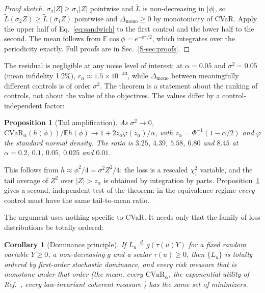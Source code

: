 \documentclass[aps,pra,twocolumn,superscriptaddress,reprint,nofootinbib,floatfix]{revtex4-2}
\newtheorem{proposition}{Proposition}
\newtheorem{corollary}{Corollary}
\theoremstyle{definition}
\newcommand{\cvar}{\mathrm{CVaR}}
\newcommand{\E}{\mathbb{E}}
\newcommand{\Lt}{\widetilde L}
\newcommand{\sref}[1]{Sec.~\ref{S-#1}}
\begin{document}
\begin{proof}[Proof sketch]
$\sigma_2|Z|\ge\sigma_1|Z|$ pointwise and $\Lt$ is non-decreasing in
$|\phi|$, so $\Lt(\sigma_2Z)\ge\Lt(\sigma_1Z)$ pointwise and
$\Delta_{\mathrm{mono}}\ge0$ by monotonicity of CVaR. Apply the upper half of
Eq.~\eqref{eq:sandwich} to the first control and the lower half to the
second. The mean follows from $\E\cos\phi=e^{-\sigma^2/2}$, which integrates
over the periodicity exactly. Full proofs are in \sref{sec:proofs}.
\end{proof}

The residual is negligible at any noise level of interest: at $\alpha=0.05$
and $\sigma^2=0.05$ (mean infidelity 1.2\%), $r_\alpha\approx1.5\times10^{-43}$,
while $\Delta_{\mathrm{mono}}$ between meaningfully different controls is of
order $\sigma^2$. The theorem is a statement about the ranking of controls,
not about the value of the objectives. The values differ by a
control-independent factor:

\begin{proposition}[Tail amplification]
\label{prop:ratio}
As $\sigma^2\to0$, $\cvar_\alpha(h(\phi))/\E h(\phi)\to1+2z_\alpha\varphi(z_\alpha)/\alpha$,
with $z_\alpha=\Phi^{-1}(1-\alpha/2)$ and $\varphi$ the standard normal
density. The ratio is $3.25$, $4.39$, $5.58$, $6.80$ and $8.45$ at
$\alpha=0.2$, $0.1$, $0.05$, $0.025$ and $0.01$.
\end{proposition}

This follows from $h\approx\phi^2/4=\sigma^2Z^2/4$: the loss is a rescaled
$\chi^2_1$ variable, and the tail average of $Z^2$ over $|Z|>z_\alpha$ is
obtained by integration by parts. Proposition~\ref{prop:ratio} gives a
second, independent test of the theorem: in the equivalence regime
\emph{every} control must have the same tail-to-mean ratio.

The argument uses nothing specific to CVaR. It needs only that the family of
loss distributions be totally ordered:

\begin{corollary}[Dominance principle]
\label{cor:general}
If $L_u\overset{d}{=}g(\tau(u)Y)$ for a fixed random variable $Y\ge0$, a
non-decreasing $g$ and a scalar $\tau(u)\ge0$, then $\{L_u\}$ is totally
ordered by first-order stochastic dominance, and every risk measure that is
monotone under that order (the mean, every $\cvar_\alpha$, the exponential
utility of Ref.~\cite{Ge2021}, every law-invariant coherent measure
\cite{Shaked2007,Follmer2016}) has the same set of minimizers.
\end{corollary}
\end{document}
